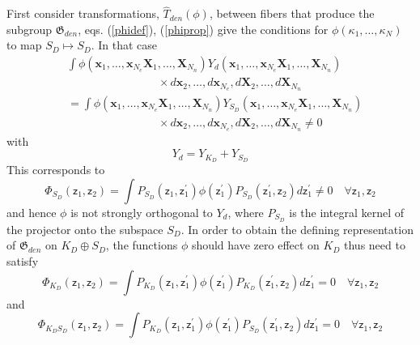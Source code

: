 \documentclass[aps,preprint]{revtex4}%
\begin{document}
First consider transformations, $\hat{T}_{den}\left(  \phi\right)  $, between
fibers that produce the subgroup $\mathfrak{G}_{den}$, eqs. (\ref{phidef}),
(\ref{phiprop}) give the conditions for $\phi(\kappa_{1},\ldots,\kappa_{N})$
to map $S_{D}\mapsto S_{D}$. In that case
\begin{align}
&  \int\phi(\mathbf{x}_{1},\ldots,\mathbf{x}_{N_{e}}\mathbf{X}_{1}%
,\ldots,\mathbf{X}_{N_{n}})Y_{d}(\mathbf{x}_{1},\ldots,\mathbf{x}_{N_{e}%
}\mathbf{X}_{1},\ldots,\mathbf{X}_{N_{n}})\nonumber\\
&  \qquad\qquad\qquad\qquad\times d\mathbf{x}_{2},\ldots,d\mathbf{x}_{N_{e}%
},d\mathbf{X}_{2},\ldots,d\mathbf{X}_{N_{n}}\nonumber\\
&  =\int\phi(\mathbf{x}_{1},\ldots,\mathbf{x}_{N_{e}}\mathbf{X}_{1}%
,\ldots,\mathbf{X}_{N_{n}})Y_{S_{D}}(\mathbf{x}_{1},\ldots,\mathbf{x}_{N_{e}%
}\mathbf{X}_{1},\ldots,\mathbf{X}_{N_{n}})\nonumber\\
&  \qquad\qquad\qquad\qquad\times d\mathbf{x}_{2},\ldots,d\mathbf{x}_{N_{e}%
},d\mathbf{X}_{2},\ldots,d\mathbf{X}_{N_{n}}\neq0
\end{align}
with%
\begin{equation}
Y_{d}=Y_{K_{D}}+Y_{S_{D}} \label{YKdYSd}%
\end{equation}
This corresponds to
\begin{equation}
\Phi_{S_{D}}\left(  \mathsf{z}_{1},\mathsf{z}_{2}\right)  =\int P_{S_{D}%
}\left(  \mathsf{z}_{1},\mathsf{z}_{1}^{\prime}\right)  \phi\left(
\mathsf{z}_{1}^{\prime}\right)  P_{S_{D}}\left(  \mathsf{z}_{1}^{\prime
},\mathsf{z}_{2}\right)  d\mathsf{z}_{1}^{\prime}\neq0\quad\forall
\mathsf{z}_{1},\mathsf{z}_{2} \label{projS}%
\end{equation}
and hence $\phi$ is not strongly orthogonal to $Y_{d}$, where $P_{S_{D}}$ is
the integral kernel of the projector onto the subspace $S_{D}$. In order to
obtain the defining representation of $\mathfrak{G}_{den}$ on $K_{D}\oplus
S_{D}$, the functions $\phi$ should have zero effect on $K_{D}$ thus need to
satisfy
\begin{equation}
\Phi_{K_{D}}\left(  \mathsf{z}_{1},\mathsf{z}_{2}\right)  =\int P_{K_{D}%
}\left(  \mathsf{z}_{1},\mathsf{z}_{1}^{\prime}\right)  \phi\left(
\mathsf{z}_{1}^{\prime}\right)  P_{K_{D}}\left(  \mathsf{z}_{1}^{\prime
},\mathsf{z}_{2}\right)  d\mathsf{z}_{1}^{\prime}=0\quad\forall\mathsf{z}%
_{1},\mathsf{z}_{2} \label{projK}%
\end{equation}
and
\begin{equation}
\Phi_{K_{D}S_{D}}\left(  \mathsf{z}_{1},\mathsf{z}_{2}\right)  =\int P_{K_{D}%
}\left(  \mathsf{z}_{1},\mathsf{z}_{1}^{\prime}\right)  \phi\left(
\mathsf{z}_{1}^{\prime}\right)  P_{S_{D}}\left(  \mathsf{z}_{1}^{\prime
},\mathsf{z}_{2}\right)  d\mathsf{z}_{1}^{\prime}=0\quad\forall\mathsf{z}%
_{1},\mathsf{z}_{2} \label{projKS}%
\end{equation}
\end{document}
